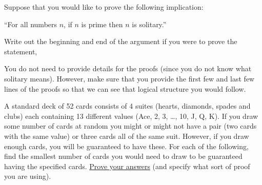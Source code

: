\documentclass[10pt]{exam}
\begin{document}

\begin{questions}

  \question[9] Suppose that you would like to prove the following implication:
  \begin{center}
  ``For all numbers $n$, if $n$ is prime then $n$ is solitary.''
  \end{center}
  Write out the beginning and end of the argument if you were to prove the statement,
  You do not need to provide details for the proofs (since you do not know what solitary means). However, make sure that you provide the first few and last few lines of the proofs so that we can see that logical structure you would follow.



  \question[9] A standard deck of 52 cards consists of 4 suites (hearts, diamonds, spades and clubs) each containing 13 different values (Ace, 2, 3, \ldots, 10, J, Q, K).  If you draw some number of cards at random you might or might not have a pair (two cards with the same value) or three cards all of the same suit.  However, if you draw enough cards, you will be guaranteed to have these.  For each of the following, find the smallest number of cards you would need to draw to be guaranteed having the specified cards.  \underline{Prove your answers} (and specify what sort of proof you are using).
  \begin{parts}

\end{parts}
\end{questions}
\end{document}
